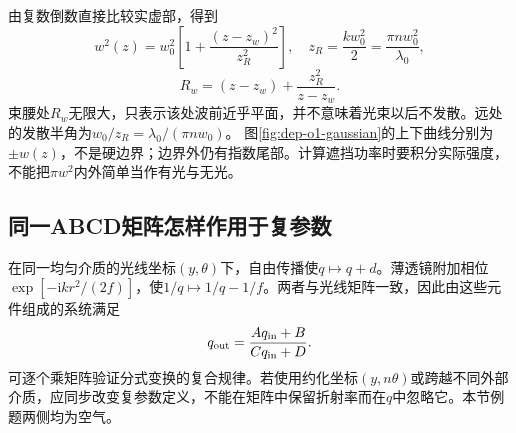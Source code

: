由复数倒数直接比较实虚部，得到
\[
 w^2(z)=w_0^2\left[1+\frac{(z-z_w)^2}{z_R^2}\right],
 \quad z_R=\frac{kw_0^2}{2}=\frac{\pi n w_0^2}{\lambda_0},
\]
\[
 R_w=(z-z_w)+\frac{z_R^2}{z-z_w}.
\]
束腰处$R_w$无限大，只表示该处波前近乎平面，并不意味着光束以后不发散。远处的发散半角为$w_0/z_R=\lambda_0/(\pi n w_0)$。
图\ref{fig:dep-o1-gaussian}的上下曲线分别为$\pm w(z)$，不是硬边界；边界外仍有指数尾部。计算遮挡功率时要积分实际强度，不能把$\pi w^2$内外简单当作有光与无光。

\subsection{同一ABCD矩阵怎样作用于复参数}
在同一均匀介质的光线坐标$(y,\theta)$下，自由传播使$q\mapsto q+d$。薄透镜附加相位$\exp[-\mathrm ikr^2/(2f)]$，使$1/q\mapsto1/q-1/f$。两者与光线矩阵一致，因此由这些元件组成的系统满足
\[
 q_{\rm out}=\frac{Aq_{\rm in}+B}{Cq_{\rm in}+D}.
\]
可逐个乘矩阵验证分式变换的复合规律。若使用约化坐标$(y,n\theta)$或跨越不同外部介质，应同步改变复参数定义，不能在矩阵中保留折射率而在$q$中忽略它。本节例题两侧均为空气。

